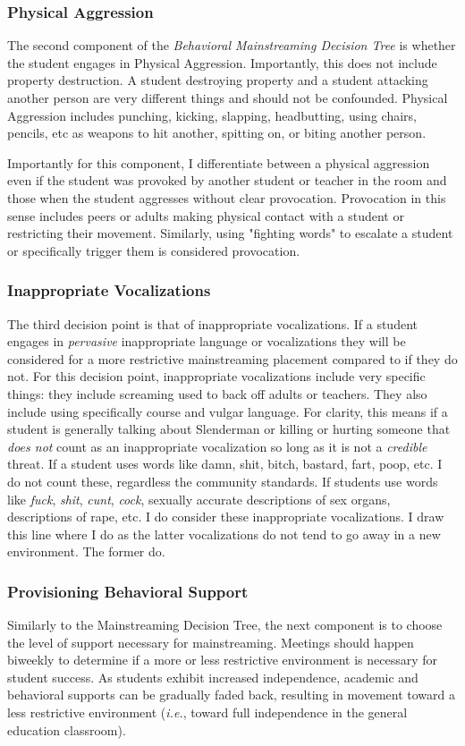 \documentclass[twoside]{article}
\begin{document}
\subsubsection{Physical Aggression}
The second component of the \textit{Behavioral Mainstreaming Decision Tree} is whether the student engages in Physical Aggression. Importantly, this does not include property destruction. A student destroying property and a student attacking another person are very different things and should not be confounded. Physical Aggression includes punching, kicking, slapping, headbutting, using chairs, pencils, etc as weapons to hit another, spitting on, or biting another person. 

Importantly for this component, I differentiate between a physical aggression even if the student was provoked by another student or teacher in the room and those when the student aggresses without clear provocation. Provocation in this sense includes peers or adults making physical contact with a student or restricting their movement. Similarly, using "fighting words" to escalate a student or specifically trigger them is considered provocation. 

\subsubsection{Inappropriate Vocalizations}
The third decision point is that of inappropriate vocalizations. If a student engages in \textit{pervasive} inappropriate language or vocalizations they  will be considered for a more restrictive mainstreaming placement compared to if they do not. For this decision point, inappropriate vocalizations include very specific things: they include screaming used to back off adults or teachers. They also include using specifically course and vulgar language. For clarity, this means if a student is generally talking about Slenderman or killing or hurting someone that \textit{does not} count as an inappropriate vocalization so long as it is not a \textit{credible} threat. If a student uses words like damn, shit, bitch, bastard, fart, poop, etc. I do not count these, regardless the community standards. If students use words like \textit{fuck}, \textit{shit}, \textit{cunt}, \textit{cock}, sexually accurate descriptions of sex organs, descriptions of rape, etc. I do consider these inappropriate vocalizations. I draw this line where I do as the latter vocalizations do not tend to go away in a new environment. The former do.

\subsubsection{Provisioning Behavioral Support}
Similarly to the Mainstreaming Decision Tree, the next component is to choose the level of support necessary for mainstreaming. Meetings should happen biweekly to determine if a more or less restrictive environment is necessary for student success.  As students exhibit increased independence, academic and behavioral supports can be gradually faded back, resulting in movement toward a less restrictive environment (\textit{i.e.}, toward full independence in the general education classroom). 
\end{document}
